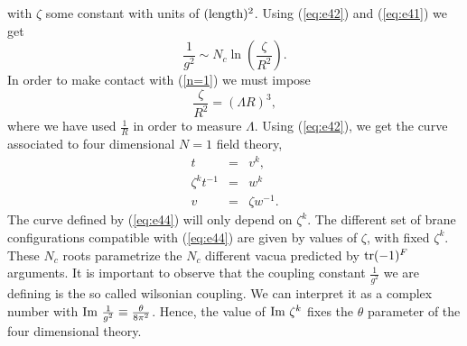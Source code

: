 with $\zeta$ some constant with units of $(\hbox {length})^2$.
Using (\ref{eq:e42}) and (\ref{eq:e41}) we get
\begin{equation}
\frac {1}{g^2} \sim N_c \ln \left( \frac {\zeta}{R^2} \right). 
\end{equation}
In order to make contact with (\ref{n=1}) we must impose
\begin{equation}
\frac {\zeta}{R^2} = (\Lambda R)^3,
\end{equation}
where we have used $\frac {1}{R}$ in order to measure $\Lambda$.
Using (\ref{eq:e42}), we get the curve associated to four
dimensional $N=1$ field theory,
\begin{eqnarray}
t & = & v^k, \nonumber \\
\zeta^k t^{-1} & = & w^k \nonumber \\
v & = & \zeta w^{-1}.
\label{eq:e44}
\end{eqnarray}
The curve defined by (\ref{eq:e44}) will only depend on
$\zeta^k$. The different
set of brane configurations compatible with (\ref{eq:e44}) are
given by values of $\zeta$, with fixed $\zeta^k$. These $N_c$
roots parametrize the $N_c$ different vacua
predicted by $\hbox {tr} (-1)^F$ arguments. It is important to
observe that the coupling constant $\frac {1}{g^2}$ we are
defining is the so called wilsonian coupling. We can interpret it
as a complex number with $\hbox {Im } \frac {1}{g^2} \equiv
\frac {\theta}{8 \pi^2}$. Hence, the value of $\hbox {Im }
\zeta^k$ fixes the $\theta$ parameter of the four dimensional
theory.
  

